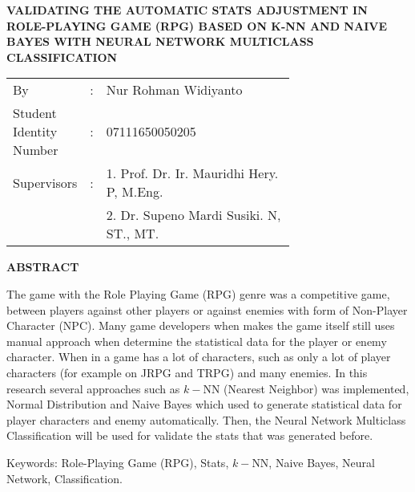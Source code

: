 \begin{spacing}{1}
	\begin{center}
		\large\textbf{VALIDATING THE AUTOMATIC STATS ADJUSTMENT IN ROLE-PLAYING GAME (RPG) BASED ON K-NN AND NAIVE BAYES WITH NEURAL NETWORK MULTICLASS CLASSIFICATION}
	\end{center}
	\vspace{2ex}
	
	\begin{adjustwidth}{-0.2cm}{}
		\begin{tabular}{lcp{0.7\linewidth}}
			By &:& Nur Rohman Widiyanto \\
			Student Identity Number &:&	07111650050205 \\
			Supervisors &:& 1. Prof. Dr. Ir. Mauridhi Hery. P, M.Eng. \\
			& & 2. Dr. Supeno Mardi Susiki. N, ST., MT. \\
		\end{tabular}
	\end{adjustwidth}
	\vspace{2ex}
	
	\begin{center}
		\large\textbf{ABSTRACT}
	\end{center}
	\vspace{1ex}
	
	The game with the Role Playing Game (RPG) genre was a competitive game, between players against other players or against enemies with form of Non-Player Character (NPC). Many game developers when makes the game itself still uses manual approach when determine the statistical data for the player or enemy character. When in a game has a lot of characters, such as only a lot of player characters (for example on JRPG and TRPG) and many enemies. In this research several approaches such as $k-$NN (Nearest Neighbor) was implemented, Normal Distribution and Naive Bayes which used to generate statistical data for player characters and enemy automatically. Then, the Neural Network Multiclass Classification will be used for validate the stats that was generated before.
	\vspace{2ex}

	Keywords: Role-Playing Game (RPG), Stats, $k-$NN, Naive Bayes, Neural Network, Classification.
\end{spacing}
